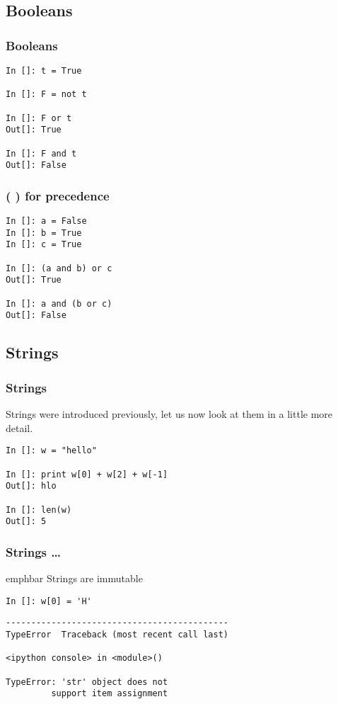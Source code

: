 \documentclass[14pt,compress]{beamer}
\newcommand{\emphbar}[1]
{\begin{beamercolorbox}[rounded=true]{emphbar} 
      {#1}
 \end{beamercolorbox}
}
\newcounter{time}
\newcommand{\inctime}[1]{\addtocounter{time}{#1}{\tiny \thetime\ m}}
\begin{document}
\subsection{Booleans}
\begin{frame}[fragile]
  \frametitle{Booleans}
  \begin{lstlisting}
In []: t = True

In []: F = not t

In []: F or t
Out[]: True

In []: F and t
Out[]: False
  \end{lstlisting}
  \inctime{5}
\end{frame}

\begin{frame}[fragile]
  \frametitle{( )  for precedence}
  \begin{lstlisting}
In []: a = False
In []: b = True
In []: c = True

In []: (a and b) or c
Out[]: True

In []: a and (b or c)
Out[]: False
  \end{lstlisting}
  \inctime{5}
\end{frame}

\subsection{Strings}

\begin{frame}[fragile]
  \frametitle{Strings}
Strings were introduced previously, let us now look at them in a little more detail.
  \begin{lstlisting}
In []: w = "hello"

In []: print w[0] + w[2] + w[-1]
Out[]: hlo

In []: len(w)
Out[]: 5
  \end{lstlisting}
\end{frame}

\begin{frame}[fragile]
  \frametitle{Strings \ldots}
  \emphbar{Strings are immutable}
  \begin{lstlisting}
In []: w[0] = 'H' 
  \end{lstlisting}
  \pause
  \begin{lstlisting}
--------------------------------------------
TypeError  Traceback (most recent call last)

<ipython console> in <module>()

TypeError: 'str' object does not
         support item assignment
  \end{lstlisting}
\end{frame}
\end{document}
